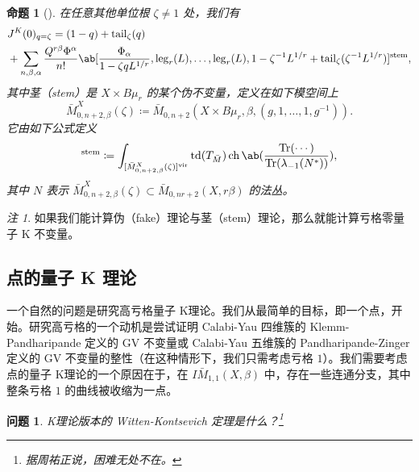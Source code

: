 \documentclass{amsart}
\newtheorem{prop}[thm]{命题}
\newtheorem{quest}[thm]{问题}
\theoremstyle{definition}
\theoremstyle{remark}
\newtheorem{rmk}[thm]{注}
\theoremstyle{plain}
\theoremstyle{definition}
\theoremstyle{remark}
\newcommand{\mr}[1]{\mathrm{#1}}
\newcommand{\on}[1]{\operatorname{#1}}
\newcommand{\1}{\mathbf{1}}
\newcommand{\2}{\mathbf{2}}
\newcommand{\3}{\mathbf{3}}
\newcommand{\vir}{\mr{vir}}
\begin{document}
\begin{prop}[{\cite{GiventalTonita2014}}]
    在任意其他单位根 \(\zeta \neq 1\) 处，我们有
    \begin{align*}
        &J^K(0)_{q = \zeta} = (1-q) + \mr{tail}_{\zeta}(q) \\
        &+ \sum_{n,\beta,\alpha} \frac{Q^{r\beta}\Phi^{\alpha}}{n!} \ab[\frac{\Phi_{\alpha}}{1-\zeta q L^{1/r}}, \mr{leg}_r(L), \ldots, \mr{leg}_r(L), 1 - \zeta^{-1}L^{1/r} + \mr{tail}_{\zeta}(\zeta^{-1} L^{1/r})]^{\mr{stem}},
    \end{align*}
    其中茎（stem）是 \(X \times B\mu_r\) 的某个伪不变量，定义在如下模空间上
    \[ \bar{M}_{0,n+2,\beta}^X(\zeta) \coloneqq \bar{M}_{0,n+2}(X \times B\mu_r, \beta, (g, 1, \ldots, 1, g^{-1})). \]
    它由如下公式定义
    \begin{align*}
        [\cdots]^{\mr{stem}} \coloneqq \int_{[\bar{M}_{0,n+2,\beta}^X(\zeta)]^{\vir}} \on{td}(T_{\bar{M}}) \on{ch}\ab(\frac{\on{Tr}(\cdots)}{\on{Tr}(\lambda_{-1}(N^*))}), 
    \end{align*}
    其中 \(N\) 表示 \(\bar{M}_{0,n+2,\beta}^X(\zeta) \subset \bar{M}_{0,nr+2}(X, r\beta)\) 的法丛。
\end{prop}

\begin{rmk}
    如果我们能计算伪（fake）理论与茎（stem）理论，那么就能计算亏格零量子 K 不变量。
\end{rmk}


\subsection{点的量子 K 理论}%
\label{sub:Quantum K-theory of a point}

一个自然的问题是研究高亏格量子 K理论。我们从最简单的目标，即一个点，开始。研究高亏格的一个动机是尝试证明 Calabi-Yau 四维簇的 Klemm-Pandharipande 定义的 GV 不变量或 Calabi-Yau 五维簇的 Pandharipande-Zinger 定义的 GV 不变量的整性（在这种情形下，我们只需考虑亏格 \(1\)）。我们需要考虑点的量子 K理论的一个原因在于，在 \(I\bar{M}_{1,1}(X, \beta)\) 中，存在一些连通分支，其中整条亏格 \(1\) 的曲线被收缩为一点。

\begin{quest}
    K理论版本的 Witten-Kontsevich 定理是什么？\footnote{据周祐正说，困难无处不在。}
\end{quest}
\end{document}
